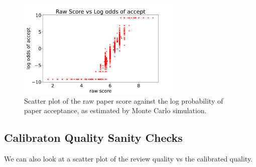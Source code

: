 \begin{figure}[htb]
\includegraphics[width=0.70\textwidth]{diagrams/neurips/raw-score-vs-log-odds.pdf}


\caption{Scatter plot of the raw paper score against the log probability of paper acceptance, as estimated by Monte Carlo simulation.}
\label{raw-score-vs-log-odds}
\end{figure}

\hypertarget{calibraton-quality-sanity-checks}{%
\subsection{Calibraton Quality Sanity
Checks}\label{calibraton-quality-sanity-checks}}

\begin{Shaded}
\begin{Highlighting}[]
\OperatorTok{=} 
\OperatorTok{=}
\end{Highlighting}
\end{Shaded}

We can also look at a scatter plot of the review quality vs the
calibrated quality.

\begin{Shaded}
\begin{Highlighting}[]
\OperatorTok{=}\OperatorTok{=}
\OperatorTok{=}\NormalTok{)}
\NormalTok{ax.set\_xlim([}\NormalTok{, }\NormalTok{])}
\NormalTok{)}
\NormalTok{\_ }\OperatorTok{=}\NormalTok{)}
\OperatorTok{=}\OperatorTok{=}\NormalTok{)}
\end{Highlighting}
\end{Shaded}

